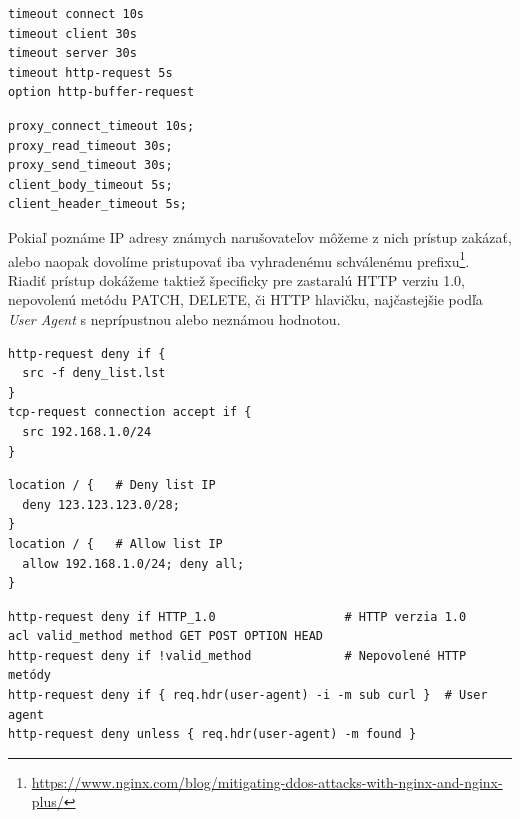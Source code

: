 \documentclass[12pt, a4paper]{article}
\begin{document}
\noindent\begin{minipage}{.48\textwidth}
\begin{lstlisting}[caption=HAProxy: timeout časovače]
timeout connect 10s
timeout client 30s
timeout server 30s
timeout http-request 5s
option http-buffer-request
\end{lstlisting}
\end{minipage}\hfill
\begin{minipage}{.48\textwidth}
\begin{lstlisting}[caption=NGINX: timeout časovače]
proxy_connect_timeout 10s; 
proxy_read_timeout 30s;
proxy_send_timeout 30s; 
client_body_timeout 5s;
client_header_timeout 5s;
\end{lstlisting}
\end{minipage}

Pokiaľ poznáme IP adresy známych narušovateľov môžeme z nich prístup zakázať, alebo naopak dovolíme
pristupovať iba vyhradenému schválenému prefixu\footnote{\url{https://www.nginx.com/blog/mitigating-ddos-attacks-with-nginx-and-nginx-plus/}}. Riadiť prístup dokážeme taktiež špecificky
pre zastaralú HTTP verziu 1.0, nepovolenú metódu PATCH, DELETE, či HTTP hlavičku, najčastejšie podľa 
\emph{User Agent} s neprípustnou alebo neznámou hodnotou.

\noindent\begin{minipage}{.48\textwidth}
\begin{lstlisting}[caption=Haproxy: ACL pre zdrojové adresy]
http-request deny if { 
  src -f deny_list.lst 
}
tcp-request connection accept if { 
  src 192.168.1.0/24
}
\end{lstlisting}
\end{minipage}\hfill
\begin{minipage}{.48\textwidth}
\begin{lstlisting}[caption=NGINX: ACL pre zdrojové adresy]
location / {   # Deny list IP
  deny 123.123.123.0/28; 
}          
location / {   # Allow list IP
  allow 192.168.1.0/24; deny all; 
}
\end{lstlisting}
\end{minipage}

\begin{lstlisting}[caption=HAProxy: Zablokovanie HTTP požiadavky podľa jej atribútov]
http-request deny if HTTP_1.0                  # HTTP verzia 1.0
acl valid_method method GET POST OPTION HEAD
http-request deny if !valid_method             # Nepovolené HTTP metódy
http-request deny if { req.hdr(user-agent) -i -m sub curl }  # User agent
http-request deny unless { req.hdr(user-agent) -m found }
\end{lstlisting}
\end{document}
